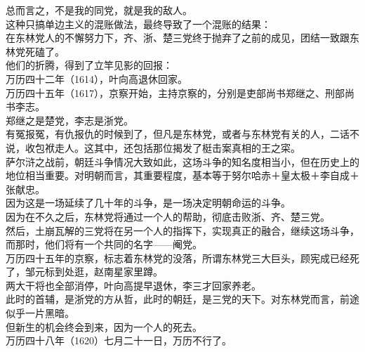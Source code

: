 \begin{multicols}{\theparacolNo}
总而言之，不是我的同党，就是我的敌人。\\

这种只搞单边主义的混账做法，最终导致了一个混账的结果：\\

在东林党人的不懈努力下，齐、浙、楚三党终于抛弃了之前的成见，团结一致跟东林党死磕了。\\

他们的折腾，得到了立竿见影的回报：\\

万历四十二年（1614），叶向高退休回家。\\

万历四十五年（1617），京察开始，主持京察的，分别是吏部尚书郑继之、刑部尚书李志。\\

郑继之是楚党，李志是浙党。\\

有冤报冤，有仇报仇的时候到了，但凡是东林党，或者与东林党有关的人，二话不说，收包袱走人。这其中，还包括那位揭发了梃击案真相的王之寀。\\

萨尔浒之战前，朝廷斗争情况大致如此，这场斗争的知名度相当小，但在历史上的地位相当重要。对明朝而言，其重要程度，基本等于努尔哈赤＋皇太极＋李自成＋张献忠。\\

因为这是一场延续了几十年的斗争，是一场决定明朝命运的斗争。\\

因为在不久之后，东林党将通过一个人的帮助，彻底击败浙、齐、楚三党。\\

然后，土崩瓦解的三党将在另一个人的指挥下，实现真正的融合，继续这场斗争，而那时，他们将有一个共同的名字——阉党。\\

万历四十五年的京察，标志着东林党的没落，所谓东林党三大巨头，顾宪成已经死了，邹元标到处逛，赵南星家里蹲。\\

两大干将也全部消停，叶向高提早退休，李三才回家养老。\\

此时的首辅，是浙党的方从哲，此时的朝廷，是三党的天下。对东林党而言，前途似乎一片黑暗。\\

但新生的机会终会到来，因为一个人的死去。\\

万历四十八年（1620）七月二十一日，万历不行了。\\


\end{multicols}

